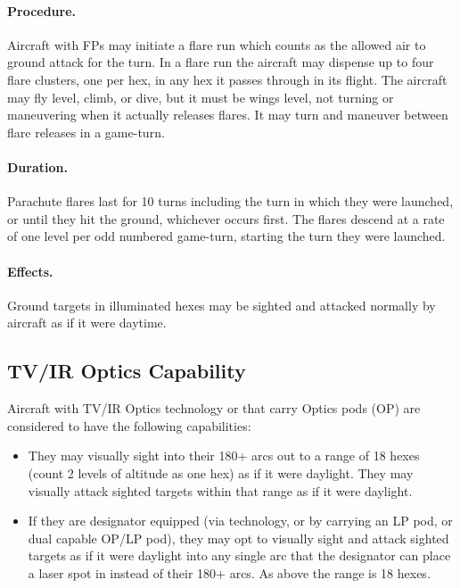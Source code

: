 \begin{advancedrules}
\paragraph{Procedure.} Aircraft with FPs may initiate a flare run which counts as the allowed air to ground attack for the turn. In a flare run the aircraft may dispense up to four flare clusters, one per hex, in any hex it passes through in its flight. The aircraft may fly level, climb, or dive, but it must be wings level, not turning or maneuvering when it actually releases flares. It may turn and maneuver between flare releases in a game-turn.

\paragraph{Duration.} Parachute flares last for 10 turns including the turn in which they were launched, or until they hit the ground, whichever occurs first. The flares descend at a rate of one level per odd numbered game-turn, starting the turn they were launched.

\paragraph{Effects.} Ground targets in illuminated hexes may be sighted and attacked normally by aircraft as if it were daytime.

\subsection{TV/IR Optics Capability}

Aircraft with TV/IR Optics technology or that carry Optics pods (OP) are considered to have the following capabilities:

\begin{itemize}

    \item They may visually sight into their 180+ arcs out to a range of 18 hexes (count 2 levels of altitude as one hex) as if it were daylight. They may visually attack sighted targets within that range as if it were daylight.

    \item If they are designator equipped (via technology, or by carrying an LP pod, or dual capable OP/LP pod), they may opt to visually sight and attack sighted targets as if it were daylight into any single arc that the designator can place a laser spot in instead of their 180+ arcs. As above the range is 18 hexes.


\end{itemize}
\end{advancedrules}
